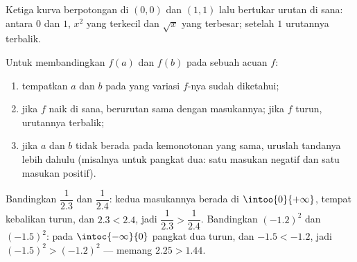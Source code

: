 \begin{omfigure}

{\small Ketiga kurva berpotongan di $(0,0)$ dan $(1,1)$ lalu bertukar urutan
di sana: antara $0$ dan $1$, $x^2$ yang terkecil dan $\sqrt x$ yang
terbesar; setelah $1$ urutannya terbalik.}
\end{omfigure}

\begin{method}\label{met:g10:reffunc:compare}
Untuk membandingkan $f(a)$ dan $f(b)$ pada sebuah  acuan $f$:
\begin{enumerate}
  \item tempatkan $a$ dan $b$ pada  yang variasi $f$-nya sudah
        diketahui;
  \item jika $f$ naik di sana,  berurutan sama dengan
        masukannya; jika $f$ turun, urutannya terbalik;
  \item jika $a$ dan $b$ tidak berada pada  kemonotonan yang sama,
        uruslah tandanya lebih dahulu (misalnya untuk pangkat dua: satu
        masukan negatif dan satu masukan positif).
\end{enumerate}
\end{method}

\begin{example}
Bandingkan $\dfrac{1}{2.3}$ dan $\dfrac{1}{2.4}$: kedua masukannya berada di
$\intoo{0}{+\infty}$, tempat  kebalikan turun, dan
$2.3 < 2.4$, jadi $\dfrac{1}{2.3} > \dfrac{1}{2.4}$. Bandingkan $(-1.2)^2$
dan $(-1.5)^2$: pada $\intoc{-\infty}{0}$ pangkat dua turun, dan
$-1.5 < -1.2$, jadi $(-1.5)^2 > (-1.2)^2$ --- memang $2.25 > 1.44$.
\end{example}

